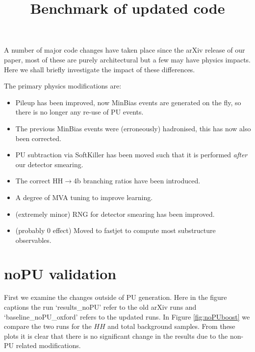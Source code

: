 \documentclass[11pt]{article}
\title{Benchmark of updated code}
\begin{document}
\maketitle

A number of major code changes have taken place since the arXiv release of our paper, most of these
are purely architectural but a few may have physics impacts. Here we shall briefly investigate the impact
of these differences.

The primary physics modifications are:
\begin{itemize}
\item{} Pileup has been improved, now MinBias events are generated on the fly, so there is no longer any re-use of PU events. 
\item{} The previous MinBias events were (erroneously) hadronised, this has now also been corrected.
\item{} PU subtraction via SoftKiller has been moved such that it is performed \emph{after} our detector smearing.
\item{} The correct HH$\to$4b branching ratios have been introduced.
\item{} A degree of MVA tuning to improve learning.
\item{} (extremely minor) RNG for detector smearing has been improved.
\item{} (probably 0 effect) Moved to fastjet to compute most substructure observables.
\end{itemize}


\section{noPU validation}
First we examine the changes outside of PU generation. Here in the figure captions the run `results\_noPU' refer to the old arXiv runs and  `baseline\_noPU\_oxford' refers to the updated runs. In Figure \ref{fig:noPUboost} we compare the two runs for the $HH$ and total background samples. From these plots it is clear that there is no significant change in the results due to the non-PU related modifications.
\end{document}
